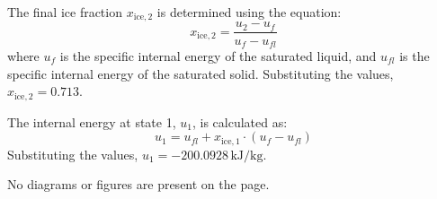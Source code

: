 The final ice fraction \( x_{\text{ice},2} \) is determined using the equation:  
\[
x_{\text{ice},2} = \frac{u_2 - u_f}{u_f - u_{fl}}
\]  
where \( u_f \) is the specific internal energy of the saturated liquid, and \( u_{fl} \) is the specific internal energy of the saturated solid. Substituting the values, \( x_{\text{ice},2} = 0.713 \).  

The internal energy at state 1, \( u_1 \), is calculated as:  
\[
u_1 = u_{fl} + x_{\text{ice},1} \cdot (u_f - u_{fl})
\]  
Substituting the values, \( u_1 = -200.0928 \, \text{kJ/kg} \).  

No diagrams or figures are present on the page.